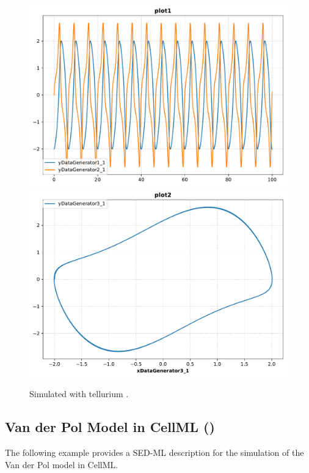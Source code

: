 \begin{figure}[ht]
\begin{minipage}{0.47\textwidth}
        \includegraphics[width=1.0\textwidth]{examples/vanderpol-sbml/results/tellurium/plot1}
        \includegraphics[width=1.0\textwidth]{examples/vanderpol-sbml/results/tellurium/plot2}
        \caption{Simulated with tellurium \citep{tellurium}.}
    \end{minipage}
    \label{fig:lorenz-sbml}
\end{figure}


\subsection{Van der Pol Model in CellML ()}
\label{example:vanderpol_cellml}
The following example provides a SED-ML description for the simulation of the Van der Pol model in CellML.

